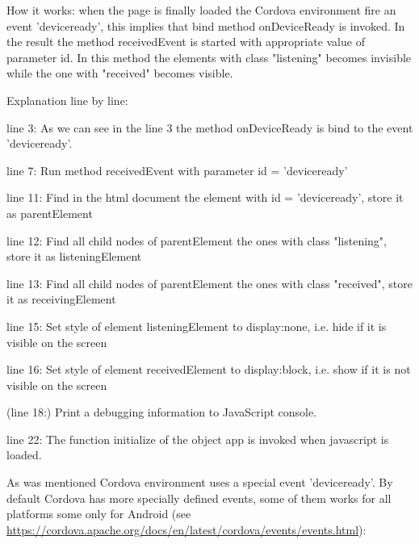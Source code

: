 \begin{explain}
How it works: when the page is finally loaded the Cordova environment fire an event 'deviceready', this implies that bind method onDeviceReady is invoked. In the result the method receivedEvent is started with appropriate value of parameter id. In this method the elements with class "listening" becomes invisible while the one with "received" becomes visible.

Explanation line by line:
\begin{description}
\item{line 3:} As we can see in the line 3 the method onDeviceReady is bind to the event 'deviceready'.
\item{line 7:} Run method receivedEvent with parameter id = 'deviceready'
\item{line 11:} Find in the html document the element with id = 'deviceready', store it as parentElement
\item{line 12:} Find all child nodes of parentElement the ones with class "listening", store it as listeningElement
\item{line 13:} Find all child nodes of parentElement the ones with class "received", store it as receivingElement
\item{line 15:} Set style of element listeningElement to display:none, i.e. hide if it is visible on the screen
\item{line 16:} Set style of element receivedElement to display:block, i.e. show if it is not visible on the screen
\item(line 18:) Print a debugging information to JavaScript console.
\item{line 22:} The function initialize of the object app is invoked when javascript is loaded.
\end{description}
\end{explain}

As was mentioned Cordova environment uses a special event 'deviceready'. By default Cordova has more specially defined events, some of them works for all platforms some only for Android (see \url{https://cordova.apache.org/docs/en/latest/cordova/events/events.html}):

